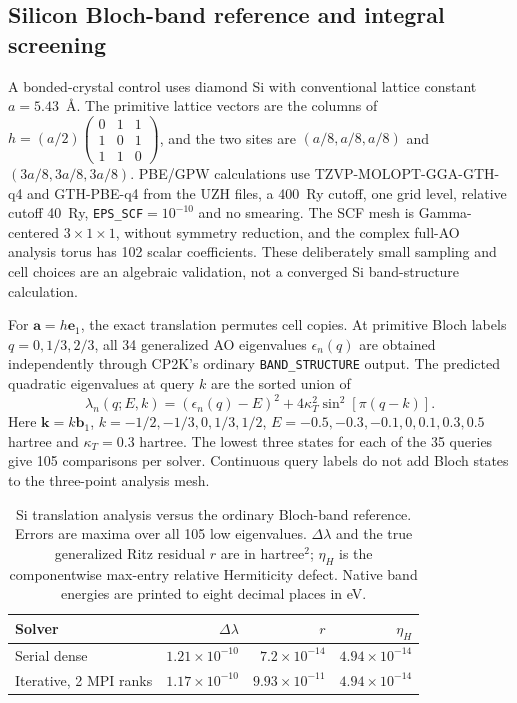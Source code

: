 \documentclass[11pt]{article}
\begin{document}
\subsection{Silicon Bloch-band reference and integral screening}
\label{sec:si-silicon-translation}
A bonded-crystal control uses diamond Si with conventional
lattice constant $a=5.43$~\AA. The primitive lattice vectors are
the columns of
$h=(a/2)\left(\begin{smallmatrix}0&1&1\\1&0&1\\1&1&0\end{smallmatrix}\right)$,
and the two sites are $(a/8,a/8,a/8)$ and
$(3a/8,3a/8,3a/8)$. PBE/GPW calculations use
TZVP-MOLOPT-GGA-GTH-q4 and GTH-PBE-q4 from the UZH files,
a 400~Ry cutoff, one grid level, relative cutoff 40~Ry,
\texttt{EPS\_SCF}$=10^{-10}$ and no smearing.
The SCF mesh is Gamma-centered $3\times1\times1$, without
symmetry reduction, and the complex full-AO analysis torus has
102 scalar coefficients. These deliberately small sampling and
cell choices are an algebraic validation, not a converged Si
band-structure calculation.

For $\bm a=h\bm e_1$, the exact translation permutes cell copies.
At primitive Bloch labels $q=0,1/3,2/3$, all 34 generalized AO
eigenvalues $\epsilon_n(q)$ are obtained independently through
CP2K's ordinary \texttt{BAND\_STRUCTURE} output. The predicted
quadratic eigenvalues at query $k$ are the sorted union of
\begin{equation}
 \lambda_n(q;E,k)=(\epsilon_n(q)-E)^2
             +4\kappa_T^2\sin^2[\pi(q-k)].
 \label{eq:si-silicon-bloch-quadratic}
\end{equation}
Here $\bm k=k\bm b_1$, $k=-1/2,-1/3,0,1/3,1/2$,
$E=-0.5,-0.3,-0.1,0,0.1,0.3,0.5$ hartree and
$\kappa_T=0.3$ hartree. The lowest three states for each of the
35 queries give 105 comparisons per solver. Continuous query
labels do not add Bloch states to the three-point analysis mesh.

\begin{table}[htbp]
\centering
\caption{Si translation analysis versus the ordinary Bloch-band
reference. Errors are maxima over all 105 low eigenvalues.
$\Delta\lambda$ and the true generalized Ritz residual $r$
are in hartree$^2$; $\eta_H$ is the componentwise max-entry
relative Hermiticity defect. Native band energies are printed
to eight decimal places in eV.}
\label{tab:silicon-translation}
\begin{tabular}{lrrr}
\toprule
Solver & $\Delta\lambda$ & $r$ & $\eta_H$\\
\midrule
Serial dense & $1.21\times10^{-10}$ & $7.2\times10^{-14}$ & $4.94\times10^{-14}$\\
Iterative, 2 MPI ranks & $1.17\times10^{-10}$ & $9.93\times10^{-11}$ & $4.94\times10^{-14}$\\
\bottomrule
\end{tabular}
\end{table}
\end{document}
